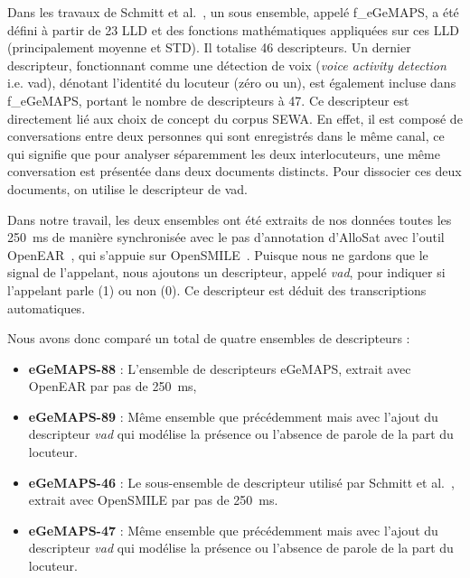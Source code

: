Dans les travaux de Schmitt et al.~\cite{Schmitt2019}, un sous ensemble, appelé f\_eGeMAPS, a été défini à partir de 23 LLD et des fonctions mathématiques appliquées sur ces LLD (principalement moyenne et STD). Il totalise 46 descripteurs. Un dernier descripteur, fonctionnant comme une détection de voix (\textit{voice activity detection} i.e. vad), dénotant l'identité du locuteur (zéro ou un), est également incluse dans f\_eGeMAPS, portant le nombre de descripteurs à 47. Ce descripteur est directement lié aux choix de concept du corpus SEWA. En effet, il est composé de conversations entre deux personnes qui sont enregistrés dans le même canal, ce qui signifie que pour analyser séparemment les deux interlocuteurs, une même conversation est présentée dans deux documents distincts. Pour dissocier ces deux documents, on utilise le descripteur de vad.

Dans notre travail, les deux ensembles ont été extraits de nos données toutes les 250~ms de manière synchronisée avec le pas d'annotation d'AlloSat avec l'outil OpenEAR~\cite{OpenEAR}, qui s'appuie sur OpenSMILE~\cite{OPENSMILE}. Puisque nous ne gardons que le signal de l'appelant, nous ajoutons un descripteur, appelé \textit{vad}, pour indiquer si l'appelant parle (1) ou non (0). Ce descripteur est déduit des transcriptions automatiques.

Nous avons donc comparé un total de quatre ensembles de descripteurs :
\begin{itemize}
    \item \textbf{eGeMAPS-88} : L'ensemble de descripteurs eGeMAPS, extrait avec OpenEAR par pas de 250~ms,
    \item \textbf{eGeMAPS-89} : Même ensemble que précédemment mais avec l'ajout du descripteur \textit{vad} qui modélise la présence ou l'absence de parole de la part du locuteur.
    \item \textbf{eGeMAPS-46} : Le sous-ensemble de descripteur utilisé par Schmitt et al.~\cite{Schmitt2019}, extrait avec OpenSMILE par pas de 250~ms.
    \item \textbf{eGeMAPS-47} : Même ensemble que précédemment mais avec l'ajout du descripteur \textit{vad} qui modélise la présence ou l'absence de parole de la part du locuteur.
\end{itemize}

